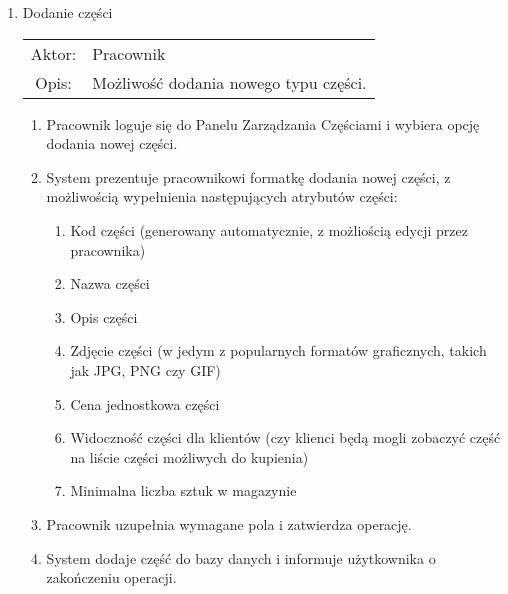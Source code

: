 \begin{enumerate}
  \item Dodanie części \label{dodanie-czesci} \\
  \begin{tabularx}{\linewidth}{ c X }
  Aktor: & Pracownik \\
  Opis: & Możliwość dodania nowego typu części.\\
  \end{tabularx}
   \begin{enumerate}
    \item Pracownik loguje się do Panelu Zarządzania Częściami i wybiera opcję dodania nowej części.
    \item System prezentuje pracownikowi formatkę dodania nowej części, z możliwością wypełnienia następujących atrybutów części:
    \begin{enumerate}
      \item Kod części (generowany automatycznie, z możliością edycji przez pracownika)
      \item Nazwa części
      \item Opis części
      \item Zdjęcie części (w jedym z popularnych formatów graficznych, takich jak JPG, PNG czy GIF)
      \item Cena jednostkowa części
      \item Widoczność części dla klientów (czy klienci będą mogli zobaczyć część na liście części możliwych do kupienia)
      \item Minimalna liczba sztuk w magazynie
    \end{enumerate}
    \item Pracownik uzupełnia wymagane pola i zatwierdza operację.
    \item System dodaje część do bazy danych i informuje użytkownika o zakończeniu operacji.
  \end{enumerate}
  

\end{enumerate}
